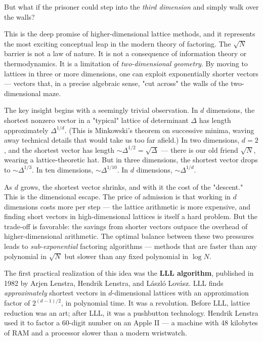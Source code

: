 But what if the prisoner could step into the \textit{third dimension} and simply walk over the walls?

This is the deep promise of higher-dimensional lattice methods, and it represents the most exciting conceptual leap in the modern theory of factoring. The $\sqrt{N}$ barrier is not a law of nature. It is not a consequence of information theory or thermodynamics. It is a limitation of \textit{two-dimensional geometry}. By moving to lattices in three or more dimensions, one can exploit exponentially shorter vectors --- vectors that, in a precise algebraic sense, "cut across" the walls of the two-dimensional maze.

The key insight begins with a seemingly trivial observation. In $d$ dimensions, the shortest nonzero vector in a "typical" lattice of determinant $\Delta$ has length approximately $\Delta^{1/d}$. (This is Minkowski's theorem on successive minima, waving away technical details that would take us too far afield.) In two dimensions, $d = 2$, and the shortest vector has length $\sim \Delta^{1/2} = \sqrt{\Delta}$ --- there is our old friend $\sqrt{N}$, wearing a lattice-theoretic hat. But in three dimensions, the shortest vector drops to $\sim \Delta^{1/3}$. In ten dimensions, $\sim \Delta^{1/10}$. In $d$ dimensions, $\sim \Delta^{1/d}$.

As $d$ grows, the shortest vector shrinks, and with it the cost of the "descent." This is the dimensional escape. The price of admission is that working in $d$ dimensions costs more per step --- the lattice arithmetic is more expensive, and finding short vectors in high-dimensional lattices is itself a hard problem. But the trade-off is favorable: the savings from shorter vectors outpace the overhead of higher-dimensional arithmetic. The optimal balance between these two pressures leads to \textit{sub-exponential} factoring algorithms --- methods that are faster than any polynomial in $\sqrt{N}$ but slower than any fixed polynomial in $\log N$.

The first practical realization of this idea was the \textbf{LLL algorithm}, published in 1982 by Arjen Lenstra, Hendrik Lenstra, and László Lovász. LLL finds \textit{approximately} shortest vectors in $d$-dimensional lattices with an approximation factor of $2^{(d-1)/2}$, in polynomial time. It was a revolution. Before LLL, lattice reduction was an art; after LLL, it was a pushbutton technology. Hendrik Lenstra used it to factor a 60-digit number on an Apple II --- a machine with 48 kilobytes of RAM and a processor slower than a modern wristwatch.

